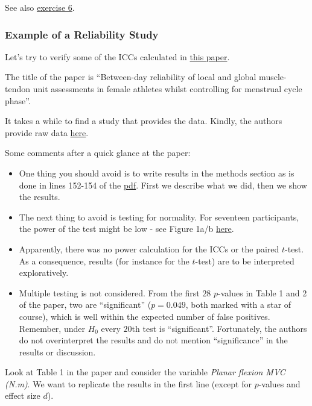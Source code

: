 \documentclass[
]{article}
\begin{document}
See also \hyperref[exercise6]{exercise 6}.

\subsubsection{Example of a Reliability Study}\label{example_RELStudy}

Let's try to verify some of the ICCs calculated in
\href{https://www.biorxiv.org/content/10.1101/2024.06.23.600286v2.abstract}{this paper}.

The title of the paper is ``Between-day reliability of local
and global muscle-tendon unit assessments in female athletes
whilst controlling for menstrual cycle phase''.

It takes a while to find a study that provides the data. Kindly, the authors
provide raw data \href{https://figshare.com/articles/dataset/Test-retest_dataset_xlsx/26477206?file=48128929}{here}.

Some comments after a quick glance at the paper:

\begin{itemize}
\item
  One thing you should avoid is to write results in the methods section as
  is done in lines 152-154 of the \href{https://www.biorxiv.org/content/10.1101/2024.06.23.600286v2.full.pdf}{pdf}.
  First we describe what we did, then we show the results.
\item
  The next thing to avoid is testing for normality. For seventeen participants,
  the power of the test might be low - see Figure 1a/b \href{https://www.nbi.dk/~petersen/Teaching/Stat2017/Power_Comparisons_of_Shapiro-Wilk_Kolmogorov-Smirn.pdf}{here}.
\item
  Apparently, there was no power calculation for the ICCs or the paired \(t\)-test.
  As a consequence, results (for instance for the \(t\)-test) are to be interpreted exploratively.
\item
  Multiple testing is not considered.
  From the first \(28\) \(p\)-values in Table 1 and 2 of the paper, two are ``significant''
  (\(p=0.049\), both marked with a star of course),
  which is well within the expected number of false positives. Remember,
  under \(H_0\) every \(20\)th test is ``significant''.
  Fortunately, the authors do not overinterpret the results and
  do not mention ``significance'' in the results or discussion.
\end{itemize}

Look at Table 1 in the paper and consider the variable \emph{Planar flexion MVC (N.m)}.
We want to replicate the results in the first line
(except for \(p\)-values and effect size \(d\)).
\end{document}
